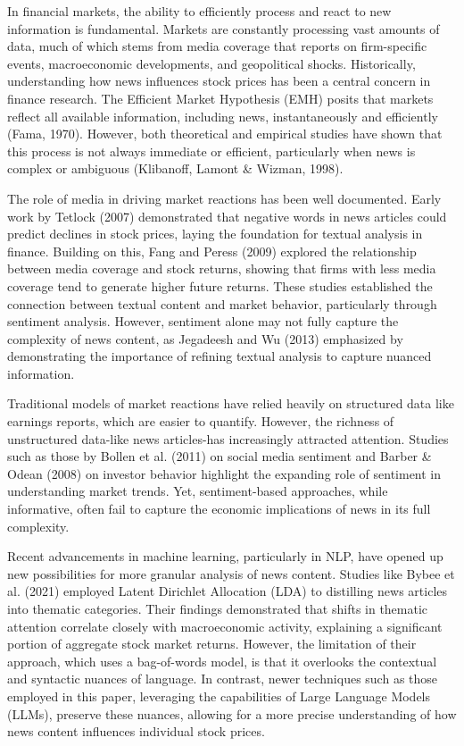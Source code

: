 
In financial markets, the ability to efficiently process and react to new information is fundamental. Markets are constantly processing vast amounts of data, much of which stems from media coverage that reports on firm-specific events, macroeconomic developments, and geopolitical shocks. Historically, understanding how news influences stock prices has been a central concern in finance research. The Efficient Market Hypothesis (EMH) posits that markets reflect all available information, including news, instantaneously and efficiently (Fama, 1970). However, both theoretical and empirical studies have shown that this process is not always immediate or efficient, particularly when news is complex or ambiguous (Klibanoff, Lamont \& Wizman, 1998).

The role of media in driving market reactions has been well documented. Early work by Tetlock (2007) demonstrated that negative words in news articles could predict declines in stock prices, laying the foundation for textual analysis in finance. Building on this, Fang and Peress (2009) explored the relationship between media coverage and stock returns, showing that firms with less media coverage tend to generate higher future returns. These studies established the connection between textual content and market behavior, particularly through sentiment analysis. However, sentiment alone may not fully capture the complexity of news content, as Jegadeesh and Wu (2013) emphasized by demonstrating the importance of refining textual analysis to capture nuanced information.

Traditional models of market reactions have relied heavily on structured data like earnings reports, which are easier to quantify. However, the richness of unstructured data-like news articles-has increasingly attracted attention. Studies such as those by Bollen et al. (2011) on social media sentiment and Barber \& Odean (2008) on investor behavior highlight the expanding role of sentiment in understanding market trends. Yet, sentiment-based approaches, while informative, often fail to capture the economic implications of news in its full complexity.

Recent advancements in machine learning, particularly in NLP, have opened up new possibilities for more granular analysis of news content. Studies like Bybee et al. (2021) employed Latent Dirichlet Allocation (LDA) to distilling news articles into thematic categories. Their findings demonstrated that shifts in thematic attention correlate closely with macroeconomic activity, explaining a significant portion of aggregate stock market returns. However, the limitation of their approach, which uses a bag-of-words model, is that it overlooks the contextual and syntactic nuances of language. In contrast, newer techniques such as those employed in this paper, leveraging the capabilities of Large Language Models (LLMs), preserve these nuances, allowing for a more precise understanding of how news content influences individual stock prices.

